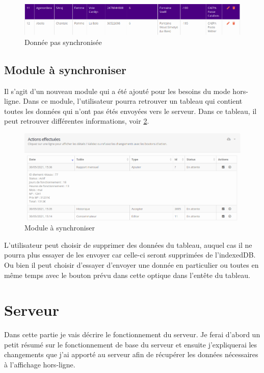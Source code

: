 \documentclass{EPL-master-thesis-covers-FR}
\begin{document}
				\begin{figure}[H]
					\centering
					\includegraphics[width=1\textwidth]{images/purple}
					\caption{Donnée pas synchronisée}
					\label{fig:purple}
				\end{figure}
							
			\subsection{Module à synchroniser}
				Il s'agit d'un nouveau module qui a été ajouté pour les besoins du mode hors-ligne. Dans ce module, l'utilisateur pourra retrouver un tableau qui contient toutes les données qui n'ont pas étés envoyées vers le serveur. Dans ce tableau, il peut retrouver différentes informations, voir \ref{fig:tosync}.
				
				\begin{figure}[H]
					\centering
					\includegraphics[width=1\textwidth]{images/tosync}
					\caption{Module à synchroniser}
					\label{fig:tosync}
				\end{figure}
							
				L'utilisateur peut choisir de supprimer des données du tableau, auquel cas il ne pourra plus essayer de les envoyer car celle-ci seront supprimées de l'indexedDB. Ou bien il peut choisir d'essayer d'envoyer une donnée en particulier ou toutes en même temps avec le bouton prévu dans cette optique dans l'entête du tableau.
			
		
		\section{Serveur}
		\label{sec:serveur}
			Dans cette partie je vais décrire le fonctionnement du serveur. Je ferai d'abord un petit résumé sur le fonctionnement de base du serveur et ensuite j'expliquerai les changements que j'ai apporté au serveur afin de récupérer les données nécessaires à l'affichage hors-ligne.
			
\end{document}
